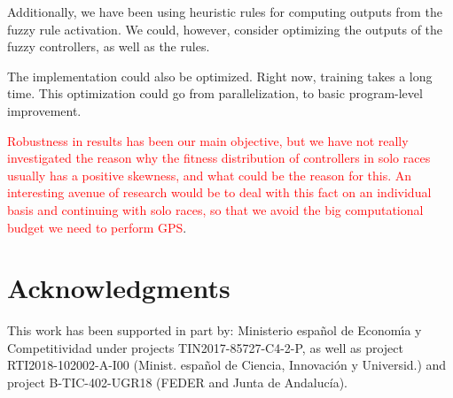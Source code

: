 \documentclass[10pt,journal,compsoc]{IEEEtran}
\begin{document}
Additionally, we have been using heuristic rules for computing outputs
from the fuzzy rule activation. We could, however, consider optimizing
the outputs of the fuzzy controllers, as well as the rules.

The implementation could also be optimized. Right now, training takes
a long time. This optimization could go from parallelization, to basic
program-level improvement.

\textcolor{red}{Robustness in results has been our main objective, but
  we have not really investigated the reason why the fitness
  distribution of controllers in solo races usually has a positive
  skewness, and what could be the reason for this. An interesting
  avenue of research would be to deal with this fact on an individual
  basis and continuing with solo races, so that we avoid the big
  computational budget we need to perform GPS}.

\section*{Acknowledgments}

This work has been supported in part by: Ministerio espa\~{n}ol de
Econom\'{\i}a y Competitividad under projects  TIN2017-85727-C4-2-P, as well as project RTI2018-102002-A-I00 (Minist. espa\~{n}ol de Ciencia, Innovaci\'{o}n y Universid.) and project B-TIC-402-UGR18 (FEDER and Junta de Andaluc\'{i}a).












\end{document}
